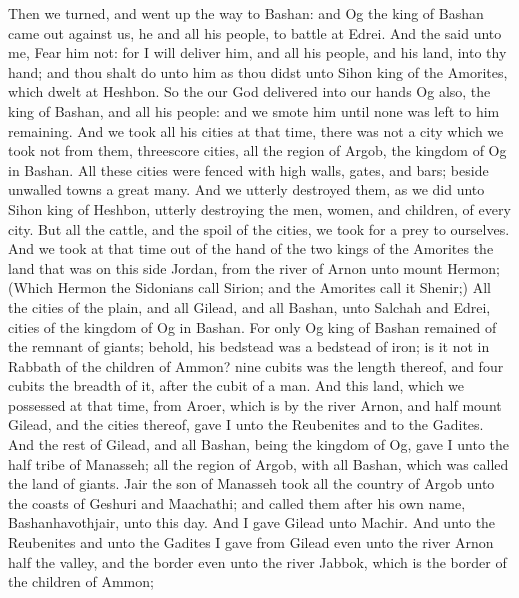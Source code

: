 \begin{biblechapter} %
 Then we turned, and went up the way to Bashan: and Og the king of Bashan came out against us, he and all his people, to battle at Edrei.
\verse And the \LORD said unto me, Fear him not: for I will deliver him, and all his people, and his land, into thy hand; and thou shalt do unto him as thou didst unto Sihon king of the Amorites, which dwelt at Heshbon.
\verse So the \LORD our God delivered into our hands Og also, the king of Bashan, and all his people: and we smote him until none was left to him remaining.
\verse And we took all his cities at that time, there was not a city which we took not from them, threescore cities, all the region of Argob, the kingdom of Og in Bashan.
\verse All these cities were fenced with high walls, gates, and bars; beside unwalled towns a great many.
\verse And we utterly destroyed them, as we did unto Sihon king of Heshbon, utterly destroying the men, women, and children, of every city.
\verse But all the cattle, and the spoil of the cities, we took for a prey to ourselves.
\verse And we took at that time out of the hand of the two kings of the Amorites the land that was on this side Jordan, from the river of Arnon unto mount Hermon;
\verse (Which Hermon the Sidonians call Sirion; and the Amorites call it Shenir;)
\verse All the cities of the plain, and all Gilead, and all Bashan, unto Salchah and Edrei, cities of the kingdom of Og in Bashan.
\verse For only Og king of Bashan remained of the remnant of giants; behold, his bedstead was a bedstead of iron; is it not in Rabbath of the children of Ammon? nine cubits was the length thereof, and four cubits the breadth of it, after the cubit of a man.
 And this land, which we possessed at that time, from Aroer, which is by the river Arnon, and half mount Gilead, and the cities thereof, gave I unto the Reubenites and to the Gadites.
\verse And the rest of Gilead, and all Bashan, being the kingdom of Og, gave I unto the half tribe of Manasseh; all the region of Argob, with all Bashan, which was called the land of giants.
\verse Jair the son of Manasseh took all the country of Argob unto the coasts of Geshuri and Maachathi; and called them after his own name, Bashanhavothjair, unto this day.
\verse And I gave Gilead unto Machir.
\verse And unto the Reubenites and unto the Gadites I gave from Gilead even unto the river Arnon half the valley, and the border even unto the river Jabbok, which is the border of the children of Ammon;

\end{biblechapter}
